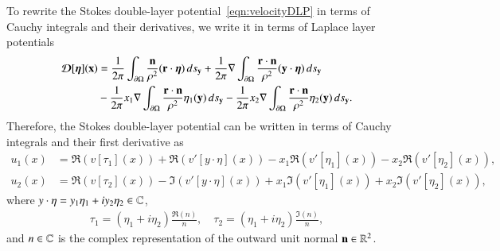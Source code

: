\documentclass[preprint,10pt]{elsarticle}
\begin{document}
To rewrite the Stokes double-layer potential~\eqref{eqn:velocityDLP} in
terms of Cauchy integrals and their derivatives, we write it in terms of
Laplace layer potentials~\cite{bar-wu-vee2015}
\begin{equation}
  \label{eqn:Stokes2Laplace}
  \begin{aligned}
    {\boldsymbol{\mathcal D}}[{\boldsymbol\eta}]({\mathbf{x}}) &= 
      \frac{1}{2\pi} \int_{{\partial}\Omega} 
        \frac{{\mathbf{n}}}{\rho^2} ({\mathbf{r}} \cdot {\boldsymbol\eta}) \, ds_{\mathbf{y}} + 
      \frac{1}{2\pi} \nabla \int_{{\partial}\Omega}
        \frac{{\mathbf{r}} \cdot {\mathbf{n}}}{\rho^2} ({\mathbf{y}} \cdot {\boldsymbol\eta}) \, ds_{\mathbf{y}} \\
      &- \frac{1}{2\pi} x_1 \nabla \int_{{\partial}\Omega}
        \frac{{\mathbf{r}} \cdot {\mathbf{n}}}{\rho^2}\eta_1({\mathbf{y}}) \, ds_{\mathbf{y}} -
      \frac{1}{2\pi} x_2 \nabla \int_{{\partial}\Omega}
        \frac{{\mathbf{r}} \cdot {\mathbf{n}}}{\rho^2}\eta_2({\mathbf{y}}) \, ds_{\mathbf{y}}.
  \end{aligned}
\end{equation}
Therefore, the Stokes double-layer potential can be written in terms of
Cauchy integrals and their first derivative as
\begin{equation}
  \begin{aligned}
    u_1(x) &= \Re (v[\tau_1](x)) + \Re (v'[y\cdot\eta](x)) 
             -x_1\Re (v'[\eta_1](x)) - x_2\Re (v'[\eta_2](x)), \\
    u_2(x) &= \Re (v[\tau_2](x)) - \Im (v'[y\cdot\eta](x)) 
         +x_1\Im (v'[\eta_1](x)) + x_2\Im (v'[\eta_2](x)),
  \end{aligned}
  \label{eqn:cauchyVelocity}
\end{equation}
where $y \cdot \eta = y_1 \eta_1 + i y_2 \eta_2 \in {\mathbb{C}}$, 
\begin{align} 
  \tau_1=(\eta_1+i\eta_2)\frac{\Re(n)}{n}, \quad
  \tau_2=(\eta_1+i\eta_2)\frac{\Im(n)}{n},
\end{align}
and $n \in {\mathbb{C}}$ is the complex representation of the outward unit normal
${\mathbf{n}} \in {\mathbb{R}}^2$.


\end{document}
